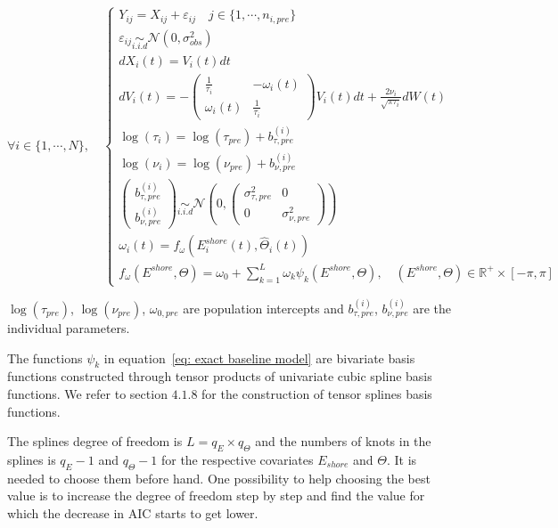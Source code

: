 \documentclass[11pt]{article}
\newcommand {\R}{\mathbb{R}}
\newcommand {\1}{\mathbb{1}}
\begin{document}
\begin{equation}  \forall i \in \{1,\cdots,N\}, \quad \left\{
	\begin{array}{l}
		Y_{ij}=X_{ij}+\varepsilon_{ij} \quad j \in \{1,\cdots,n_{i,pre}\}\\
		\varepsilon_{ij} \underset{i.i.d}{\sim} \mathcal{N}(0,\sigma_{obs}^2)  \\
		dX_i(t)=V_i(t)dt  \\
		dV_i(t)=-\begin{pmatrix} 
			\frac{1}{\tau_i} & -\omega_i(t) \\
			\omega_i(t) & \frac{1}{\tau_i}
		\end{pmatrix}V_i(t)dt+\frac{2\nu_i}{\sqrt{\pi \tau_i}} dW(t) \\
		\log(\tau_i)=\log(\tau_{pre})+b_{\tau,pre}^{(i)} \\
		\log(\nu_i)=\log(\nu_{pre})+b_{\nu,pre}^{(i)}  \\
		\begin{pmatrix} b_{\tau,pre}^{(i)} \\ b_{\nu,pre}^{(i)} \end{pmatrix} \underset{i.i.d}{\sim} \mathcal{N}\left(0,\begin{pmatrix} \sigma_{\tau,pre}^2 & 0 \\ 0 & \sigma_{\nu,pre}^2 \end{pmatrix}\right) \\
		\omega_i(t)=f_{\omega}(E^{shore}_i(t),\hat{\Theta}_i(t))\\
		f_{\omega}(E^{shore},\Theta)=\omega_{0}+\sum_{k=1}^{L} \omega_{k} \psi_k(E^{shore},\Theta), \quad (E^{shore},\Theta) \in \R^+ \times [-\pi,\pi]
	\end{array}
	\right.
	\label{eq: exact baseline model}
\end{equation}



$\log(\tau_{pre})$, $\log(\nu_{pre})$, $\omega_{0,pre}$ are population intercepts and $b^{(i)}_{\tau,pre}$, $b^{(i)}_{\nu,pre}$
are the individual parameters. 

The functions $\psi_k$ in equation~\ref{eq: exact baseline model} are bivariate basis functions constructed through tensor products of univariate cubic spline basis functions. We refer to \cite{wood_generalized_2017} section $4.
1.8$ for the construction of tensor splines basis functions.

The splines degree of freedom is $L=q_E \times q_{\Theta}$ and the numbers of knots in the splines is $q_E-1$ and $q_{\Theta}-1$ for the respective covariates $E_{shore}$ and $\Theta$. It is needed to choose them before hand. One possibility to help choosing the best value is to increase the degree of freedom step by step  and find the value for which the decrease in AIC starts to get lower.\\
\end{document}
